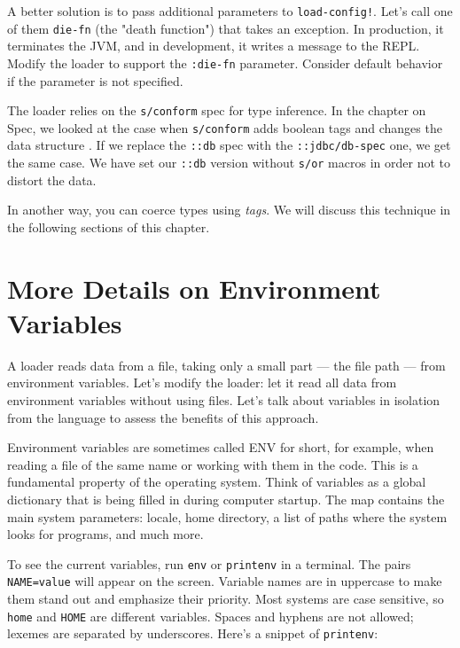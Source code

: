 \fi


\mnoindent
A better solution is to pass additional parameters to \texttt{load-config!}. Let's call one of them \verb|die-fn| (the "death function") that takes an exception. In production, it terminates the JVM, and in development, it writes a message to the REPL. Modify the loader to support the \verb|:die-fn| parameter. Consider default behavior if the parameter is not specified.

The loader relies on the \verb|s/conform| spec for type inference. In the chapter on Spec, we looked at the case when \verb|s/conform| adds boolean tags and changes the data structure . If we replace the \verb|::db| spec with the \verb|::jdbc/db-spec| one, we get the same case. We have set our \verb|::db| version without \verb|s/or| macros in order not to distort the data.


In another way, you can coerce types using \emph{tags}. We will discuss this technique in the following sections of this chapter.

\section{More Details on Environment Variables}


A loader reads data from a file, taking only a small part — the file path — from environment variables. Let's modify the loader: let it read all data from environment variables without using files. Let's talk about variables in isolation from the language to assess the benefits of this approach.

Environment variables are sometimes called ENV for short, for example, when reading a file of the same name or working with them in the code. This is a fundamental property of the operating system. Think of variables as a global dictionary that is being filled in during computer startup. The map contains the main system parameters: locale, home directory, a list of paths where the system looks for programs, and much more.


To see the current variables, run \verb|env| or \verb|printenv| in a terminal. The pairs \verb|NAME=value| will appear on the screen. Variable names are in uppercase to make them stand out and emphasize their priority. Most systems are case sensitive, so \verb|home| and \verb|HOME| are different variables. Spaces and hyphens are not allowed; lexemes are separated by underscores. Here's a snippet of \verb|printenv|:

